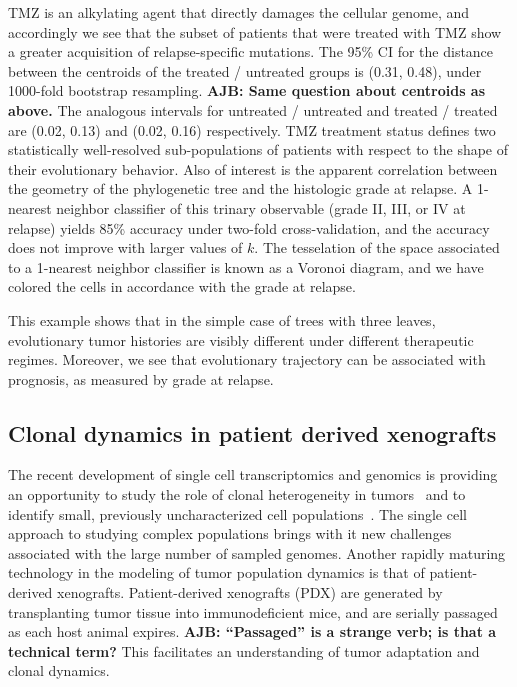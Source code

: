 \documentclass[a4paper,11pt]{article}
\begin{document}
TMZ is an alkylating agent that directly damages the cellular genome, and accordingly we see that the subset of patients that were treated with TMZ show a greater acquisition of relapse-specific mutations.
The 95\% CI for the distance between the centroids of the treated /
untreated groups is (0.31, 0.48), under 1000-fold bootstrap
resampling.
{\bf AJB: Same question about centroids as above.}
The analogous intervals for untreated / untreated and treated / treated are (0.02, 0.13) and (0.02, 0.16) respectively.
TMZ treatment status defines two statistically well-resolved sub-populations of patients with respect to the shape of their evolutionary behavior.
Also of interest is the apparent correlation between the geometry of the phylogenetic tree and the histologic grade at relapse.
A 1-nearest neighbor classifier of this trinary observable (grade II, III, or IV at relapse) yields 85\% accuracy under two-fold cross-validation, and the accuracy does not improve with larger values of $k$.
The tesselation of the space associated to a 1-nearest neighbor classifier is known as a Voronoi diagram, and we have colored the cells in accordance with the grade at relapse.

This example shows that in the simple case of trees with three leaves,
evolutionary tumor histories are visibly different under different
therapeutic regimes.  Moreover, we see that evolutionary trajectory
can be associated with prognosis, as measured by grade at relapse.

\subsection{Clonal dynamics in patient derived xenografts}\label{sec:xeno}

The recent development of single cell transcriptomics and genomics is providing an opportunity to study the role of clonal heterogeneity in tumors~\cite{navin2011tumour, eirew2014dynamics, patel2014single} and to identify small, previously uncharacterized cell populations~\cite{grun2015single}.
The single cell approach to studying complex populations brings with it new challenges associated with the large number of sampled genomes.
Another rapidly maturing technology in the modeling of tumor population dynamics is that of patient-derived xenografts.
Patient-derived xenografts (PDX) are generated by transplanting tumor
tissue into immunodeficient mice, and are serially passaged as each
host animal expires.
{\bf AJB: ``Passaged'' is a strange verb; is that a technical term?}
This facilitates an understanding of tumor adaptation and clonal dynamics.
\end{document}
